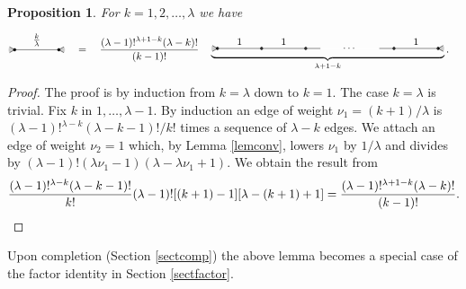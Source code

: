 \documentclass[oneside]{amsart}
\theoremstyle{plain}
\newtheorem{prop}[thm]{Proposition}
\begin{document}
\begin{prop}\label{propwtk1}
For $k=1,2,\ldots,\lambda$ we have
\begin{align}
\label{eqappendk}
\begin{tikzpicture}[baseline={([yshift=-2.5ex]current bounding box.center)}]
    \coordinate (v1) at (0,0);
    \coordinate (v2) at (1.5,0);
%
    \filldraw[black!20] (v1) -- ([shift=(150:.2)]v1) arc (150:210:.2) -- (v1);
    \draw (v1) -- ([shift=(150:.2)]v1);
    \draw (v1) -- ([shift=(210:.2)]v1);
%
    \filldraw[black!20] (v2) -- ([shift=(30:.2)]v2) arc (30:-30:.2) -- (v2);
    \draw (v2) -- ([shift=(30:.2)]v2);
    \draw (v2) -- ([shift=(-30:.2)]v2);
%
    \filldraw (v1) circle (1.3pt);
    \filldraw (v2) circle (1.3pt);
%
    \draw (v1) -- node[above] {$\frac{k}{\lambda}$} (v2);
\end{tikzpicture}
\quad
&=
\quad
\frac{\displaystyle (\lambda-1)!^{\lambda+1-k}(\lambda-k)!}{\displaystyle (k-1)!}
\quad
\underbrace{
\begin{tikzpicture}[baseline={([yshift=-2.5ex]current bounding box.center)}]
    \coordinate (v1) at (0,0);
    \coordinate (v2) at (1.5,0);
    \coordinate (v3) at (3,0);
    \coordinate (v3a) at (3.5,0);
    \node (v4) at (4.5,0) {$\cdots$};
    \coordinate (v5a) at (5.5,0);
    \coordinate (v5) at (6,0);
    \coordinate (v6) at (7.5,0);
%
%
    \filldraw[black!20] (v1) -- ([shift=(150:.2)]v1) arc (150:210:.2) -- (v1);
    \draw (v1) -- ([shift=(150:.2)]v1);
    \draw (v1) -- ([shift=(210:.2)]v1);
%
    \filldraw[black!20] (v6) -- ([shift=(30:.2)]v6) arc (30:-30:.2) -- (v6);
    \draw (v6) -- ([shift=(30:.2)]v6);
    \draw (v6) -- ([shift=(-30:.2)]v6);
%
    \filldraw (v1) circle (1.3pt);
    \filldraw (v2) circle (1.3pt);
    \filldraw (v3) circle (1.3pt);
    \filldraw (v5) circle (1.3pt);
    \filldraw (v6) circle (1.3pt);
%
    \draw[white] (v1) -- node[above] {$\phantom{\frac{k}{\lambda}}$} (v6);
    \draw (v1) -- node[above] {$1$} (v2) -- node[above] {$1$} (v3) -- (v3a);
    \draw (v5a) -- (v5) -- node[above] {$1$} (v6);
\end{tikzpicture}
}_{\lambda + 1 - k}.
\end{align}

\end{prop}
\begin{proof}
The proof is by induction from $k=\lambda$ down to $k=1$. The case $k=\lambda$ is trivial.
Fix $k$ in $1,\ldots,\lambda-1$. By induction an edge of weight $\nu_1=(k+1)/\lambda$ is $(\lambda-1)!^{\lambda-k}(\lambda-k-1)!/k!$ times a sequence of $\lambda-k$ edges.
We attach an edge of weight $\nu_2=1$ which, by Lemma \ref{lemconv}, lowers $\nu_1$ by $1/\lambda$ and divides by $(\lambda-1)!(\lambda\nu_1-1)(\lambda-\lambda\nu_1+1)$.
We obtain the result from
\begin{gather*}
\frac{(\lambda-1)!^{\lambda-k}(\lambda-k-1)!}{k!}(\lambda-1)![(k+1)-1][\lambda-(k+1)+1]=\frac{(\lambda-1)!^{\lambda+1-k}(\lambda-k)!}{(k-1)!}.
\qedhere
\end{gather*}
\end{proof}
Upon completion (Section \ref{sectcomp}) the above lemma becomes a special case of the factor identity in Section \ref{sectfactor}.
\end{document}
